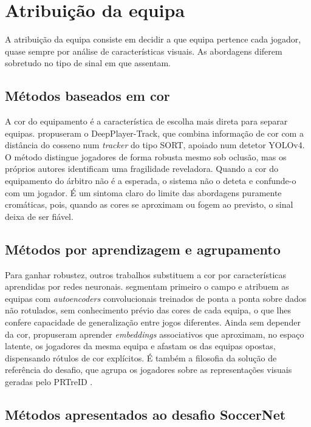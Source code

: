 \section{Atribuição da equipa}

A atribuição da equipa consiste em decidir a que equipa pertence cada jogador, quase
sempre por análise de características visuais. As abordagens diferem sobretudo no tipo de
sinal em que assentam.

\subsection{Métodos baseados em cor}

A cor do equipamento é a característica de escolha mais direta para separar equipas.
\citet{naik2022deepplayer} propuseram o DeepPlayer-Track, que combina informação de cor
com a distância do cosseno num \emph{tracker} do tipo SORT, apoiado num detetor YOLOv4.
O método distingue jogadores de forma robusta mesmo sob oclusão, mas os próprios autores
identificam uma fragilidade reveladora. Quando a cor do equipamento do árbitro não é a
esperada, o sistema não o deteta e confunde-o com um jogador. É um sintoma claro do
limite das abordagens puramente cromáticas, pois, quando as cores se aproximam ou fogem
ao previsto, o sinal deixa de ser fiável.

\subsection{Métodos por aprendizagem e agrupamento}

Para ganhar robustez, outros trabalhos substituem a cor por características aprendidas por
redes neuronais. \citet{alhejaily2023team} segmentam primeiro o campo e atribuem as
equipas com \emph{autoencoders} convolucionais treinados de ponta a ponta sobre dados não
rotulados, sem conhecimento prévio das cores de cada equipa, o que lhes confere capacidade
de generalização entre jogos diferentes. Ainda sem depender da cor,
\citet{istasse2019associative} propuseram aprender \emph{embeddings} associativos que
aproximam, no espaço latente, os jogadores da mesma equipa e afastam os das equipas
opostas, dispensando rótulos de cor explícitos. É também a filosofia da solução de
referência do desafio, que agrupa os jogadores sobre as representações visuais geradas
pelo PRTreID \citep{somers2024soccernet}.

\subsection{Métodos apresentados ao desafio SoccerNet}\label{sec:equipa-desafio}

